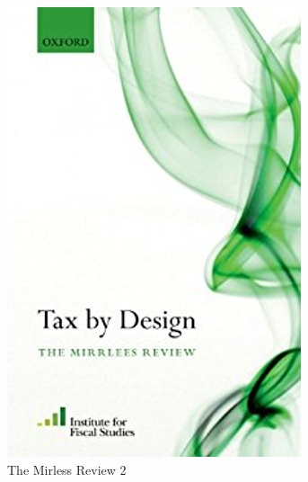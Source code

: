 \begin{frame}
\begin{figure}[htp]
\begin{minipage}[t]{0.4\textwidth}
\end{minipage}%
\hfill
\begin{minipage}[t]{0.4\textwidth}
  \centering
   \caption{The Mirless Review 2}\label{The Mirless Review 2}
   \includegraphics[width=\linewidth]{./material/fig-mirrlees-review-2.png}
\end{minipage}
\end{figure}
\end{frame}
   

        
